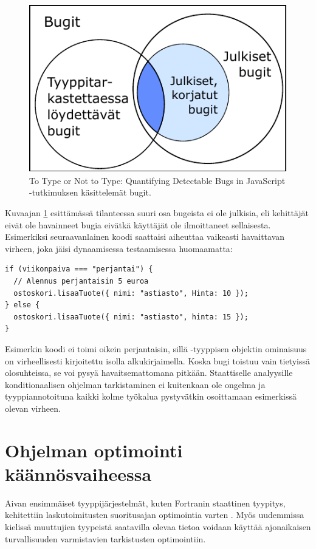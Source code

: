 \begin{figure}
\centering
\includegraphics{images/to_type_or_not_to_type_venn.pdf}
\caption{To Type or Not to Type: Quantifying Detectable Bugs in JavaScript
         -tutkimuksen käsittelemät bugit\cite{ToTypeOrNotToType}.}
\label{fig:ToTypeOrNotToType}
\end{figure}

Kuvaajan \ref{fig:ToTypeOrNotToType} esittämässä tilanteessa suuri osa
bugeista ei ole julkisia, eli kehittäjät eivät ole havainneet bugia eivätkä
käyttäjät ole ilmoittaneet sellaisesta. Esimerkiksi seuraavanlainen koodi
saattaisi aiheuttaa vaikeasti havaittavan virheen, joka jäisi dynaamisessa
testaamisessa huomaamatta:

\begin{minipage}{\linewidth}
\begin{lstlisting}[caption={Vaikeasti havaittavan virheen aiheuttava koodiesimerkki}]
if (viikonpaiva === "perjantai") {
  // Alennus perjantaisin 5 euroa
  ostoskori.lisaaTuote({ nimi: "astiasto", Hinta: 10 });
} else {
  ostoskori.lisaaTuote({ nimi: "astiasto", hinta: 15 });
}
\end{lstlisting}
\end{minipage}
Esimerkin koodi ei toimi oikein perjantaisin, sillä -tyyppisen
objektin ominaisuus  on virheellisesti kirjoitettu isolla
alkukirjaimella. Koska bugi toistuu vain tietyissä olosuhteissa, se voi pysyä
havaitsemattomana pitkään. Staattiselle analyysille konditionaalisen ohjelman
tarkistaminen ei kuitenkaan ole ongelma ja tyyppiannotoituna kaikki kolme
työkalua pystyvätkin osoittamaan esimerkissä olevan virheen.

\section{Ohjelman optimointi käännösvaiheessa}
Aivan ensimmäiset tyyppijärjestelmät, kuten Fortranin staattinen tyypitys,
kehitettiin laskutoimitusten suoritusajan optimointia varten \cite{TypesAndProgrammingLanguages}.
Myös uudemmissa kielissä muuttujien tyypeistä saatavilla olevaa tietoa
voidaan käyttää ajonaikaisen turvallisuuden varmistavien tarkistusten
optimointiin.

